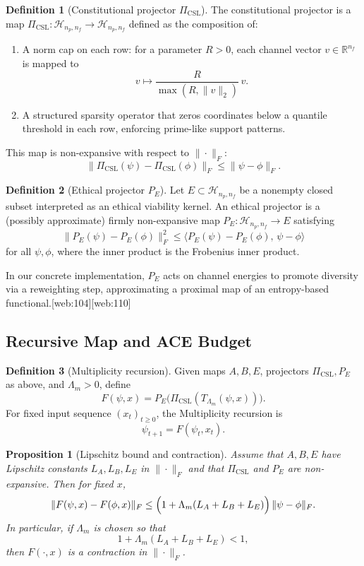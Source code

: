 \documentclass[11pt]{article}
\theoremstyle{definition}
\newtheorem{definition}{Definition}
\theoremstyle{plain}
\newtheorem{proposition}{Proposition}
\begin{document}
\begin{definition}[Constitutional projector $\Pi_{\mathrm{CSL}}$]
The constitutional projector is a map $\Pi_{\mathrm{CSL}} : \mathcal{H}_{n_p,n_f} \to \mathcal{H}_{n_p,n_f}$ defined as the composition of:
\begin{enumerate}[leftmargin=*]
  \item A norm cap on each row: for a parameter $R > 0$, each channel vector $v \in \mathbb{R}^{n_f}$ is mapped to
  \[
    v \mapsto \frac{R}{\max(R,\|v\|_2)}\,v.
  \]
  \item A structured sparsity operator that zeros coordinates below a quantile threshold in each row, enforcing prime-like support patterns.
\end{enumerate}
This map is non-expansive with respect to $\|\cdot\|_F$:
\[
  \|\Pi_{\mathrm{CSL}}(\psi) - \Pi_{\mathrm{CSL}}(\phi)\|_F \le \|\psi - \phi\|_F.
\]
\end{definition}

\begin{definition}[Ethical projector $P_E$]
Let $E \subset \mathcal{H}_{n_p,n_f}$ be a nonempty closed subset interpreted as an ethical viability kernel.
An ethical projector is a (possibly approximate) firmly non-expansive map $P_E : \mathcal{H}_{n_p,n_f} \to E$ satisfying
\[
  \|P_E(\psi) - P_E(\phi)\|_F^2 \le \langle P_E(\psi) - P_E(\phi),\, \psi - \phi\rangle
\]
for all $\psi,\phi$, where the inner product is the Frobenius inner product.
\end{definition}

In our concrete implementation, $P_E$ acts on channel energies to promote diversity via a reweighting step, approximating a proximal map of an entropy-based functional.[web:104][web:110]

\subsection{Recursive Map and ACE Budget}

\begin{definition}[Multiplicity recursion]
Given maps $A,B,E$, projectors $\Pi_{\mathrm{CSL}},P_E$ as above, and $\Lambda_m > 0$, define
\[
  F(\psi,x) = P_E\bigl(\Pi_{\mathrm{CSL}}(T_{\Lambda_m}(\psi,x))\bigr).
\]
For fixed input sequence $(x_t)_{t\ge 0}$, the Multiplicity recursion is
\[
  \psi_{t+1} = F(\psi_t,x_t).
\]
\end{definition}

\begin{proposition}[Lipschitz bound and contraction]\label{prop:lipschitz}
Assume that $A,B,E$ have Lipschitz constants $L_A,L_B,L_E$ in $\|\cdot\|_F$ and that $\Pi_{\mathrm{CSL}}$ and $P_E$ are non-expansive.
Then for fixed $x$,
\[
  \|F(\psi,x) - F(\phi,x)\|_F \le \Bigl(1 + \Lambda_m(L_A+L_B+L_E)\Bigr)\,\|\psi - \phi\|_F.
\]
In particular, if $\Lambda_m$ is chosen so that
\[
  1 + \Lambda_m(L_A+L_B+L_E) < 1,
\]
then $F(\cdot,x)$ is a contraction in $\|\cdot\|_F$.
\end{proposition}
\end{document}
